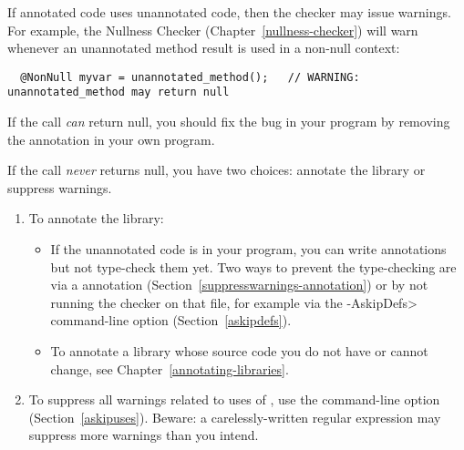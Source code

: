 If annotated code uses unannotated code, then the checker may issue
warnings.  For example, the Nullness Checker (Chapter~\ref{nullness-checker}) will
warn whenever an unannotated method result is used in a non-null context:

\begin{Verbatim}
  @NonNull myvar = unannotated_method();   // WARNING: unannotated_method may return null
\end{Verbatim}

If the call \emph{can} return null, you should fix the bug in your program by
removing the  annotation in your own program.

If the call \emph{never} returns null, you have two choices:  annotate the library
or suppress warnings.
\begin{enumerate}
\item To annotate the library:
  \begin{itemize}
  \item
    If the unannotated code is in your program, you can write annotations
    but not type-check them yet.  Two ways to prevent the type-checking are
    via a  annotation
    (Section~\ref{suppresswarnings-annotation}) or by not running the
    checker on that file, for example via the \<-AskipDefs> command-line
    option (Section~\ref{askipdefs}).
  \item
    To annotate a library whose source code you do not have or cannot
    change, see Chapter~\ref{annotating-libraries}.
  \end{itemize}
\item To suppress all warnings related to uses of
  , use the  command-line option
  (Section~\ref{askipuses}).  Beware:  a carelessly-written regular
  expression may suppress more warnings than you intend.
\end{enumerate}


